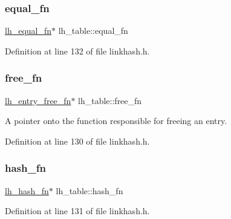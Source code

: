 \mbox{\label{structlh__table_aa646c287a6a46e09da6c7457c981a359}} 
\subsubsection{\texorpdfstring{equal\+\_\+fn}{equal\_fn}}
{\footnotesize\ttfamily \hyperlink{linkhash_8h_af74a0690267598a0ed6f0a9b66674573}{lh\+\_\+equal\+\_\+fn}$\ast$ lh\+\_\+table\+::equal\+\_\+fn}



Definition at line 132 of file linkhash.\+h.

\mbox{\label{structlh__table_a30ea5903f4f8126abd6aa489ffe14737}} 
\subsubsection{\texorpdfstring{free\+\_\+fn}{free\_fn}}
{\footnotesize\ttfamily \hyperlink{linkhash_8h_a481b0bb1ab1d6a83713d9c27aa9f07d2}{lh\+\_\+entry\+\_\+free\+\_\+fn}$\ast$ lh\+\_\+table\+::free\+\_\+fn}

A pointer onto the function responsible for freeing an entry. 

Definition at line 130 of file linkhash.\+h.

\mbox{\label{structlh__table_a1488d1a4a320b1a9bb2f441859544be1}} 
\subsubsection{\texorpdfstring{hash\+\_\+fn}{hash\_fn}}
{\footnotesize\ttfamily \hyperlink{linkhash_8h_a91d16eb45069d235a198d2184a77d0ae}{lh\+\_\+hash\+\_\+fn}$\ast$ lh\+\_\+table\+::hash\+\_\+fn}



Definition at line 131 of file linkhash.\+h.

\mbox{\label{structlh__table_aa7d986a3b12a9fa47e349713794c30fb}} 
